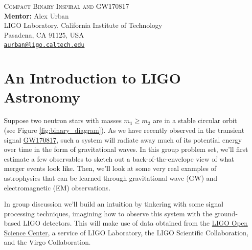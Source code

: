 \documentclass[11pt]{article}
\begin{document}
\begin{center}
{\Large\textsc{Compact Binary Inspiral and GW170817}} \\
\vspace{10pt}
{\large \textbf{Mentor:} Alex Urban} \\
{\small LIGO Laboratory, California Institute of Technology \\
Pasadena, CA 91125, USA \\
\href{mailto:aurban@ligo.caltech.edu}{\texttt{aurban@ligo.caltech.edu}}}
\end{center}


\section*{An Introduction to LIGO Astronomy}
\hspace{15pt} Suppose two neutron stars with masses $m_1 \geq m_2$ are in a stable circular orbit (see Figure \ref{fig:binary_diagram}).
As we have recently observed in the transient signal \href{https://journals.aps.org/prl/pdf/10.1103/PhysRevLett.119.161101}{GW170817}, such a
system will radiate away much of its potential energy over time in the form of gravitational waves. In this group problem set, we'll first
estimate a few observables to sketch out a back-of-the-envelope view of what merger events look like. Then, we'll look at some very real
examples of astrophysics that can be learned through gravitational wave (GW) and electromagnetic (EM) observations.

In group discussion we'll build an intuition by tinkering with some signal processing techniques, imagining how to observe this system with the
ground-based LIGO detectors. This will make use of data obtained from the \href{https://losc.ligo.org}{LIGO Open Science Center}, a service of
LIGO Laboratory, the LIGO Scientific Collaboration, and the Virgo Collaboration.

\vspace{20pt}
\end{document}
